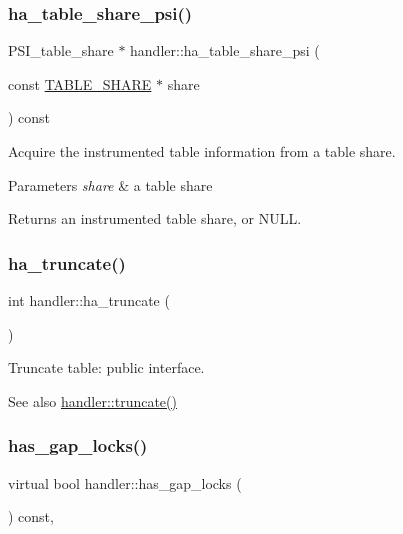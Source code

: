 \subsubsection{\texorpdfstring{ha\+\_\+table\+\_\+share\+\_\+psi()}{ha\_table\_share\_psi()}}
{\footnotesize\ttfamily P\+S\+I\+\_\+table\+\_\+share $\ast$ handler\+::ha\+\_\+table\+\_\+share\+\_\+psi (\begin{DoxyParamCaption}\item[{const \mbox{\hyperlink{structTABLE__SHARE}{T\+A\+B\+L\+E\+\_\+\+S\+H\+A\+RE}} $\ast$}]{share }\end{DoxyParamCaption}) const\hspace{0.3cm}{\ttfamily [protected]}}

Acquire the instrumented table information from a table share. 
\begin{DoxyParams}{Parameters}
{\em share} & a table share \\
\hline
\end{DoxyParams}
\begin{DoxyReturn}{Returns}
an instrumented table share, or N\+U\+LL. 
\end{DoxyReturn}
\mbox{\label{classhandler_a25394328a49d42bb45b3b263009f02c7}} 
\subsubsection{\texorpdfstring{ha\+\_\+truncate()}{ha\_truncate()}}
{\footnotesize\ttfamily int handler\+::ha\+\_\+truncate (\begin{DoxyParamCaption}{ }\end{DoxyParamCaption})}

Truncate table\+: public interface.

\begin{DoxySeeAlso}{See also}
\mbox{\hyperlink{classhandler_a13fdf15d81c256d3e6a9643532ff2126}{handler\+::truncate()}} 
\end{DoxySeeAlso}
\mbox{\label{classhandler_a7605ac9185a544f444604f11d61f6722}} 
\subsubsection{\texorpdfstring{has\+\_\+gap\+\_\+locks()}{has\_gap\_locks()}}
{\footnotesize\ttfamily virtual bool handler\+::has\+\_\+gap\+\_\+locks (\begin{DoxyParamCaption}{ }\end{DoxyParamCaption}) const\hspace{0.3cm}{\ttfamily [inline]}, {\ttfamily [virtual]}}

